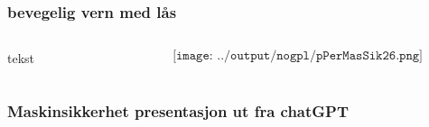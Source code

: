 \documentclass[aspectratio=169,xcolor=dvipsnames]{beamer}
\begin{document}
\begin{frame}
	\frametitle{bevegelig vern med lås}
	\begin{columns}
		\begin{column}{0.5\textwidth}
tekst
			
		\end{column}

		\begin{column}{0.5\textwidth}
	$$\texttt{[image: ../output/nogpl/pPerMasSik26.png]}$$
		\end{column}
	\end{columns}
\end{frame}

\begin{frame}
	\frametitle{Maskinsikkerhet presentasjon ut fra chatGPT}
\end{frame}
\end{document}
